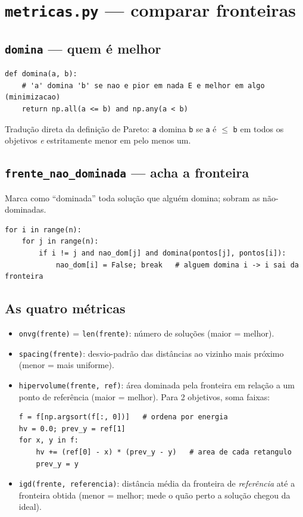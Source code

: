 \documentclass[11pt]{article}
\begin{document}
\section{\texttt{metricas.py} --- comparar fronteiras}
\subsection{\texttt{domina} --- quem é melhor}
\begin{lstlisting}
def domina(a, b):
    # 'a' domina 'b' se nao e pior em nada E e melhor em algo (minimizacao)
    return np.all(a <= b) and np.any(a < b)
\end{lstlisting}
\begin{ideia}
Tradução direta da definição de Pareto: \texttt{a} domina \texttt{b} se
\texttt{a} é $\le$ \texttt{b} em todos os objetivos \emph{e} estritamente menor em
pelo menos um.
\end{ideia}

\subsection{\texttt{frente\_nao\_dominada} --- acha a fronteira}
Marca como ``dominada'' toda solução que alguém domina; sobram as não-dominadas.
\begin{lstlisting}
for i in range(n):
    for j in range(n):
        if i != j and nao_dom[j] and domina(pontos[j], pontos[i]):
            nao_dom[i] = False; break   # alguem domina i -> i sai da fronteira
\end{lstlisting}

\subsection{As quatro métricas}
\begin{itemize}[leftmargin=1.4em,itemsep=2pt]
  \item \texttt{onvg(frente)} = \texttt{len(frente)}: número de soluções
  (maior = melhor).
  \item \texttt{spacing(frente)}: desvio-padrão das distâncias ao vizinho mais
  próximo (menor = mais uniforme).
  \item \texttt{hipervolume(frente, ref)}: área dominada pela fronteira em
  relação a um ponto de referência (maior = melhor). Para 2 objetivos, soma
  faixas:
\begin{lstlisting}
f = f[np.argsort(f[:, 0])]   # ordena por energia
hv = 0.0; prev_y = ref[1]
for x, y in f:
    hv += (ref[0] - x) * (prev_y - y)   # area de cada retangulo
    prev_y = y
\end{lstlisting}
  \item \texttt{igd(frente, referencia)}: distância média da fronteira de
  \emph{referência} até a fronteira obtida (menor = melhor; mede o quão perto a
  solução chegou da ideal).
\end{itemize}
\end{document}
